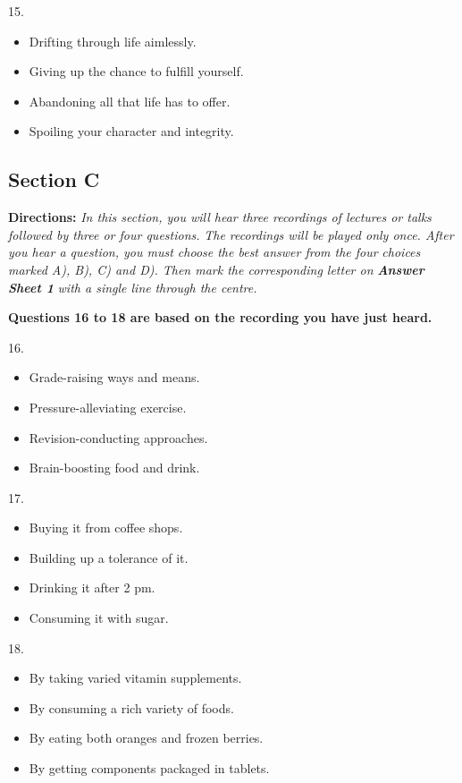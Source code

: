 \documentclass[UTF8,11pt]{ctexart}
\begin{document}
15.


\begin{itemize}[leftmargin=2em,itemsep=.2em,topsep=.4em]\item[A.] Drifting through life aimlessly.
\item[B.] Giving up the chance to fulfill yourself.
\item[C.] Abandoning all that life has to offer.
\item[D.] Spoiling your character and integrity.
\end{itemize}

\subsection*{\textbf{Section C}}


\textbf{Directions:}\textit{ In this section, you will hear three recordings of lectures or talks followed by three or four questions.} \textit{The recordings will be played only once. After you hear a question, you must choose the best answer from the four} \textit{choices marked A), B), C) and D). Then mark the corresponding letter on }\textbf{\textit{Answer Sheet 1}}\textit{ with a single line} \textit{through the centre.}


\textbf{Questions 16 to 18 are based on the recording you have just heard.}


16.


\begin{itemize}[leftmargin=2em,itemsep=.2em,topsep=.4em]\item[A.] Grade-raising ways and means.
\item[B.] Pressure-alleviating exercise.
\item[C.] Revision-conducting approaches.
\item[D.] Brain-boosting food and drink.
\end{itemize}

17.


\begin{itemize}[leftmargin=2em,itemsep=.2em,topsep=.4em]\item[A.] Buying it from coffee shops.
\item[B.] Building up a tolerance of it.
\item[C.] Drinking it after 2 pm.
\item[D.] Consuming it with sugar.
\end{itemize}

18.


\begin{itemize}[leftmargin=2em,itemsep=.2em,topsep=.4em]\item[A.] By taking varied vitamin supplements.
\item[B.] By consuming a rich variety of foods.
\item[C.] By eating both oranges and frozen berries.
\item[D.] By getting components packaged in tablets.
\end{itemize}
\end{document}
